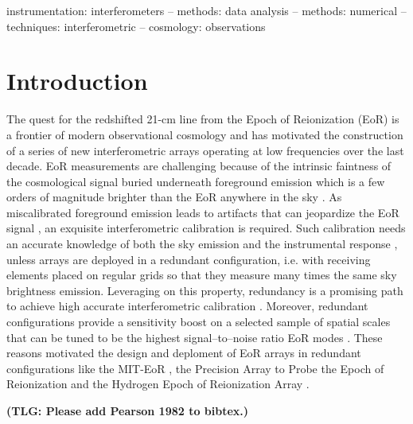 \documentclass[useAMS,usenatbib]{mn2e}
\begin{document}
\begin{abstract}
\end{abstract}


\begin{keywords}
instrumentation: interferometers -- methods: data analysis -- methods: numerical --techniques: interferometric -- cosmology: observations
\end{keywords}

\section{Introduction}
The quest for the redshifted 21-cm line from the Epoch of Reionization (EoR) is a frontier of modern observational cosmology and has motivated the construction of a series of new interferometric arrays operating at low frequencies over the last decade. EoR measurements are challenging because of the intrinsic faintness of the cosmological signal \citep[see, for instance,][for recent reviews]{Furlanetto2016,McQuinn2016} buried underneath foreground emission which is a few orders of magnitude brighter than the EoR anywhere in the sky \citep[e.g.,][]{Bernardi2009,Bernardi2010,Ghosh2012,Dillon2014,Parsons2014}. 
As miscalibrated foreground emission leads to artifacts that can jeopardize the EoR signal \citep[e.g.,][]{grobler2014,barry2016,ewall-wice2016}, an exquisite interferometric calibration is required. Such calibration needs an accurate knowledge of both the sky emission and the instrumental response \citep[e.g.,][]{Smirnov2011c}, unless arrays are deployed in a redundant configuration, i.e. with receiving elements placed on regular grids so that they measure many times the same sky brightness emission. Leveraging on this property, redundancy is a promising path to achieve high accurate interferometric calibration \citep[][]{Noordam1982,Wieringa1992,Pearson1982,Liu2010,Noorishad2012,Marthi2014,Sievers2017}. Moreover, redundant configurations provide a sensitivity boost on a selected sample of spatial scales that can be tuned to be the highest signal--to--noise ratio EoR modes \citep[][]{Parsons2012,Dillon2016}. These reasons motivated the design and deploment of EoR arrays in redundant configurations like the MIT-EoR \citep{Zheng2014}, the Precision Array to Probe the Epoch of Reionization \citep[PAPER,][]{Ali2015} and the Hydrogen Epoch of Reionization Array \citep[HERA,][]{deboer2017}. 

{\bf (TLG: Please add Pearson 1982 to bibtex.)}
\end{document}
